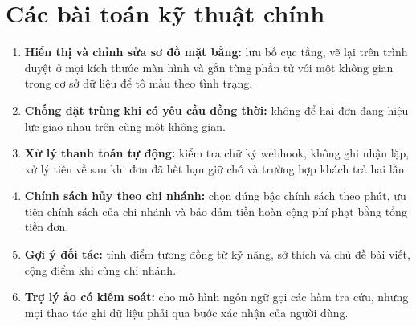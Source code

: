 \section{Các bài toán kỹ thuật chính}
\label{sec:baitoan_kythuat}

\begin{enumerate}
    \item \textbf{Hiển thị và chỉnh sửa sơ đồ mặt bằng:} lưu bố cục tầng, vẽ lại trên trình duyệt ở mọi kích thước màn hình và gắn từng phần tử với một không gian trong cơ sở dữ liệu để tô màu theo tình trạng.
    \item \textbf{Chống đặt trùng khi có yêu cầu đồng thời:} không để hai đơn đang hiệu lực giao nhau trên cùng một không gian.
    \item \textbf{Xử lý thanh toán tự động:} kiểm tra chữ ký webhook, không ghi nhận lặp, xử lý tiền về sau khi đơn đã hết hạn giữ chỗ và trường hợp khách trả hai lần.
    \item \textbf{Chính sách hủy theo chi nhánh:} chọn đúng bậc chính sách theo phút, ưu tiên chính sách của chi nhánh và bảo đảm tiền hoàn cộng phí phạt bằng tổng tiền đơn.
    \item \textbf{Gợi ý đối tác:} tính điểm tương đồng từ kỹ năng, sở thích và chủ đề bài viết, cộng điểm khi cùng chi nhánh.
    \item \textbf{Trợ lý ảo có kiểm soát:} cho mô hình ngôn ngữ gọi các hàm tra cứu, nhưng mọi thao tác ghi dữ liệu phải qua bước xác nhận của người dùng.
\end{enumerate}
